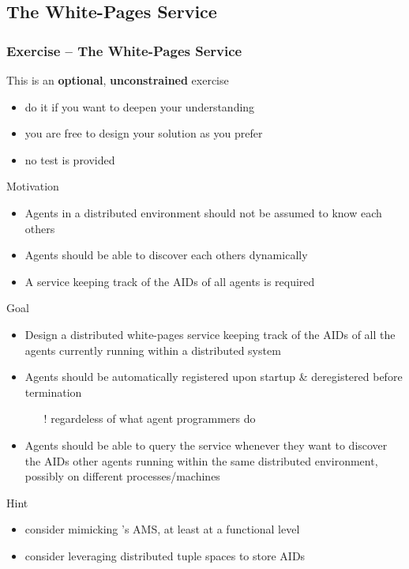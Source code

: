 \documentclass[presentation]{beamer}\mode<presentation>{\usetheme{AMSCesenaPurpleAndGold}}
\begin{document}
\startExercise

\subsection{The White-Pages Service}

\begin{frame}[allowframebreaks]
\frametitle{Exercise \currentExercise{} -- The White-Pages Service}
	\begin{alertblock}{This is an \textbf{optional}, \textbf{unconstrained} exercise}
		\begin{itemize}
			\item do it if you want to deepen your understanding
			\item you are free to design your solution as you prefer
			\item no test is provided
		\end{itemize}
	\end{alertblock}

	\begin{block}{Motivation}
		\begin{itemize}
			\item Agents in a distributed environment should not be assumed to know each others
			\item Agents should be able to discover each others dynamically
			\item A service keeping track of the AIDs of all agents is required
		\end{itemize}
	\end{block}

	\begin{block}{Goal}
		\begin{itemize}
			\item Design a distributed white-pages service keeping track of the AIDs of all the agents currently running within a distributed system
			\item Agents should be automatically registered upon startup \& deregistered before termination
			\begin{itemize}
				\item[!] regardeless of what agent programmers do
			\end{itemize}
			\item Agents should be able to query the service whenever they want to discover the AIDs other agents running within the same distributed environment, possibly on different processes/machines
		\end{itemize}
	\end{block}

	\begin{exampleblock}{Hint}
		\begin{itemize}
			\item consider mimicking \jade{}'s AMS, at least at a functional level
			\item consider leveraging distributed tuple spaces to store AIDs 
		\end{itemize}
	\end{exampleblock}
\end{frame}
\end{document}

